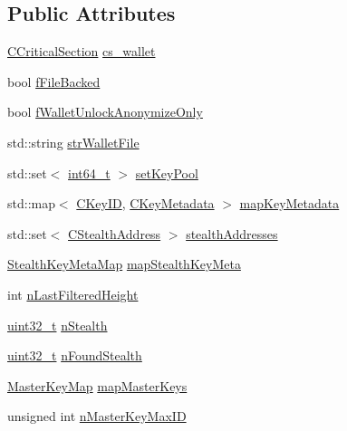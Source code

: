 \subsection*{Public Attributes}
\begin{DoxyCompactItemize}
\item 
\hyperlink{sync_8h_a37a4692b2d517f2843655ca11af7668a}{C\+Critical\+Section} \hyperlink{class_c_wallet_a4e6eb889f7638ed9695fdc0731581428}{cs\+\_\+wallet}
\item 
bool \hyperlink{class_c_wallet_a1b2e285b4d7bd105c792941aa666249c}{f\+File\+Backed}
\item 
bool \hyperlink{class_c_wallet_add6767b414d652fc4acad99f4999d670}{f\+Wallet\+Unlock\+Anonymize\+Only}
\item 
std\+::string \hyperlink{class_c_wallet_a3e886f3a3b20228770e082b3fc014fc7}{str\+Wallet\+File}
\item 
std\+::set$<$ \hyperlink{stdint_8h_adec1df1b8b51cb32b77e5b86fff46471}{int64\+\_\+t} $>$ \hyperlink{class_c_wallet_a363fabb2b82d596c33e4fa3920a11c26}{set\+Key\+Pool}
\item 
std\+::map$<$ \hyperlink{class_c_key_i_d}{C\+Key\+I\+D}, \hyperlink{class_c_key_metadata}{C\+Key\+Metadata} $>$ \hyperlink{class_c_wallet_acfd09bc5a2daee930f9f988efac8dbb7}{map\+Key\+Metadata}
\item 
std\+::set$<$ \hyperlink{class_c_stealth_address}{C\+Stealth\+Address} $>$ \hyperlink{class_c_wallet_a148a31a8069304a6593b3c5266417b10}{stealth\+Addresses}
\item 
\hyperlink{wallet_8h_a926ebc86f983a4476131d7e6f92e2386}{Stealth\+Key\+Meta\+Map} \hyperlink{class_c_wallet_aeb612f84011f0b02c070c2d39594b9fb}{map\+Stealth\+Key\+Meta}
\item 
int \hyperlink{class_c_wallet_a5a2454436e420bece1c747a3b0b09a87}{n\+Last\+Filtered\+Height}
\item 
\hyperlink{stdint_8h_a435d1572bf3f880d55459d9805097f62}{uint32\+\_\+t} \hyperlink{class_c_wallet_a9d26635575a63731798ac70047dd9b43}{n\+Stealth}
\item 
\hyperlink{stdint_8h_a435d1572bf3f880d55459d9805097f62}{uint32\+\_\+t} \hyperlink{class_c_wallet_a8bf6ef405ab6ad3c38a895df54c365d9}{n\+Found\+Stealth}
\item 
\hyperlink{class_c_wallet_a0e21167a320a0ab8f15d0e11c6749a0e}{Master\+Key\+Map} \hyperlink{class_c_wallet_a23c5badf56c297a95557af3073d4aa32}{map\+Master\+Keys}
\item 
unsigned int \hyperlink{class_c_wallet_aecfc6e4a6ea958ec369ca77d790271e3}{n\+Master\+Key\+Max\+I\+D}

\end{DoxyCompactItemize}
